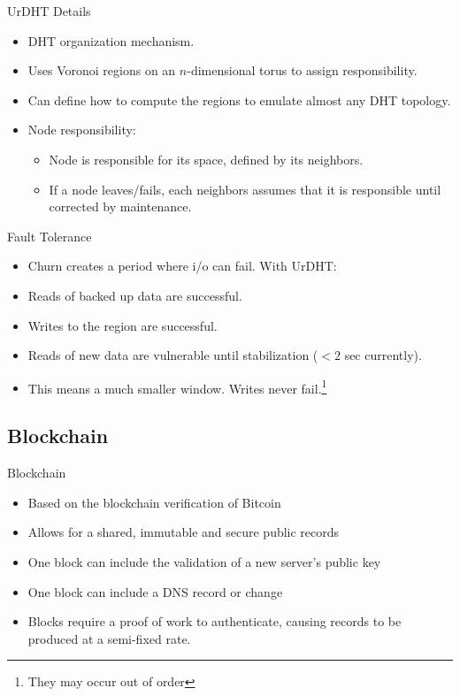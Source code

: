 \documentclass[11pt]{beamer}
\begin{document}
\begin{frame}{UrDHT Details}
	\begin{itemize}
		\item DHT organization mechanism.
		
		\item Uses Voronoi regions on an $n$-dimensional torus to assign responsibility.
		\item Can define how to compute the regions to emulate almost any DHT topology.
		\item Node responsibility:
		\begin{itemize}
			\item Node is  responsible for its space, defined by its neighbors.
			\item If a node leaves/fails, each neighbors assumes that it is responsible until corrected by maintenance. 
		\end{itemize}
	\end{itemize}


\end{frame}

\begin{frame}{Fault Tolerance}
	\begin{itemize}
		\item Churn creates a period where i/o can fail.  With UrDHT:
		\item Reads of backed up data are successful.
		\item Writes to the region are successful. 
		\item Reads of new data are vulnerable until stabilization ($ <2$ sec currently).
		\item This means a much smaller window.  Writes never fail.\footnote{They may occur out of order}
		
	\end{itemize}


\end{frame}



\subsection{Blockchain}
\begin{frame}{Blockchain}
	\begin{itemize}
		\item Based on the blockchain verification of Bitcoin
		\item Allows for a shared, immutable and secure public records
		\item One block can include the validation of a new server's public key
		\item  One block can include a DNS record or change
		\item  Blocks require a proof of work to authenticate, causing records to be produced at a semi-fixed rate.
	\end{itemize}
\end{frame}
\end{document}
